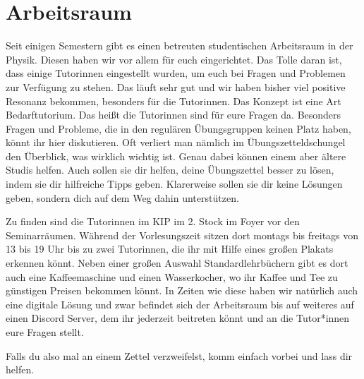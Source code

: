 \section{Arbeitsraum}
\label{sec:arbeitsraum}
Seit einigen Semestern gibt es einen betreuten studentischen Arbeitsraum in der Physik. Diesen haben wir vor allem für euch eingerichtet. Das Tolle daran ist, dass einige Tutorinnen eingestellt wurden, um euch bei Fragen und Problemen zur Verfügung zu stehen. Das läuft sehr gut und wir haben bisher viel positive Resonanz bekommen, besonders für die Tutorinnen. Das Konzept ist eine Art Bedarftutorium. Das heißt die Tutorinnen sind für eure Fragen da. Besonders Fragen und Probleme, die in den regulären Übungsgruppen keinen Platz haben, könnt ihr hier diskutieren. Oft verliert man nämlich im Übungszetteldschungel den Überblick, was wirklich wichtig ist. Genau dabei können einem aber ältere Studis helfen. Auch sollen sie dir helfen, deine Übungszettel besser zu lösen, indem sie dir hilfreiche Tipps geben. Klarerweise sollen sie dir keine Lösungen geben, sondern dich auf dem Weg dahin unterstützen.

Zu finden sind die Tutorinnen im KIP im 2. Stock im Foyer vor den Seminarräumen. Während der Vorlesungszeit sitzen dort montags bis freitags von 13 bis 19 Uhr bis zu zwei Tutorinnen, die ihr mit Hilfe eines großen Plakats erkennen könnt. Neben einer großen Auswahl Standardlehrbüchern gibt es dort auch eine Kaffeemaschine und einen Wasserkocher, wo ihr Kaffee und Tee zu günstigen Preisen bekommen könnt.
In Zeiten wie diese haben wir natürlich auch eine digitale Lösung und zwar befindet sich der Arbeitsraum bis auf weiteres auf einen Discord Server, dem ihr jederzeit beitreten könnt und an die Tutor*innen eure Fragen stellt.

Falls du also mal an einem Zettel verzweifelst, komm einfach vorbei und lass dir helfen.
